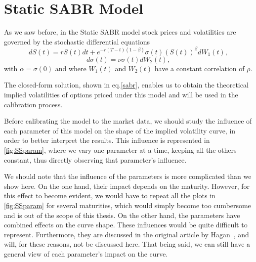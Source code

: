 \newpage
\section{Static SABR Model}
As we saw before, in the Static SABR model stock prices and volatilities are governed by the stochastic differential equations
\begin{equation}
dS(t)=rS(t)dt+e^{-r(T-t)(1-\beta)}\sigma(t)(S(t))^\beta dW_1(t),
\end{equation}
\begin{equation}
d\sigma(t)=\nu\sigma(t) dW_2(t),
\end{equation}
\noindent with $\alpha=\sigma(0)$ and where $W_1(t)$ and $W_2(t)$ have a constant correlation of $\rho$.

The closed-form solution, shown in eq.\eqref{sabr}, enables us to obtain the theoretical implied volatilities of options priced under this model and will be used in the calibration process.

Before calibrating the model to the market data, we should study the influence of each parameter of this model on the shape of the implied volatility curve, in order to better interpret the results. This influence is represented in \autoref{fig:SSparam}, where we vary one parameter at a time, keeping all the others constant, thus directly observing that parameter's influence.


We should note that the influence of the parameters is more complicated than we show here. On the one hand, their impact depends on the maturity. However, for this effect to become evident, we would have to repeat all the plots in \autoref{fig:SSparam} for several maturities, which would simply become too cumbersome and is out of the scope of this thesis.
On the other hand, the parameters have combined effects on the curve shape. These influences would be quite difficult to represent. Furthermore, they are discussed in the original article by Hagan~\citep{Hagan}, and will, for these reasons, not be discussed here.
That being said, we can still have a general view of each parameter's impact on the curve.

\vspace{\fill}
\newpage

